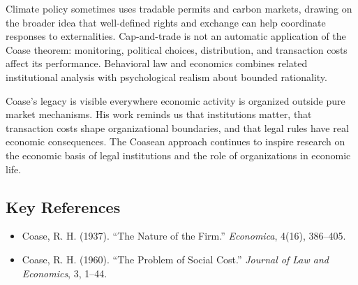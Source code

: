Climate policy sometimes uses tradable permits and carbon markets, drawing on
the broader idea that well-defined rights and exchange can help coordinate
responses to externalities. Cap-and-trade is not an automatic application of
the Coase theorem: monitoring, political choices, distribution, and transaction
costs affect its performance. Behavioral law and economics combines related
institutional analysis with psychological realism about bounded rationality.

Coase's legacy is visible everywhere economic activity is organized outside pure
market mechanisms. His work reminds us that institutions matter, that transaction
costs shape organizational boundaries, and that legal rules have real economic
consequences. The Coasean approach continues to inspire research on the economic
basis of legal institutions and the role of organizations in economic life.

\subsection*{Key References}
\begin{itemize}
    \item Coase, R. H. (1937). ``The Nature of the Firm.'' \textit{Economica}, 4(16), 386--405.
    \item Coase, R. H. (1960). ``The Problem of Social Cost.'' \textit{Journal of Law and Economics}, 3, 1--44.
\end{itemize}
